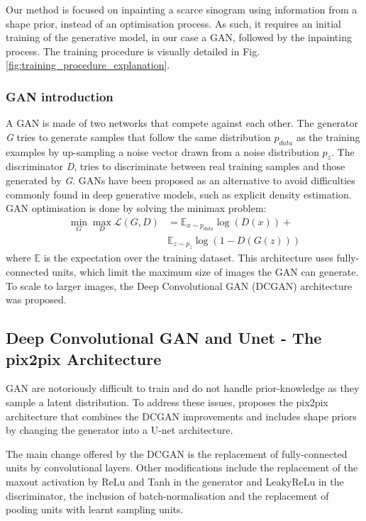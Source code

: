 \documentclass[../main.tex]{subfiles}
\begin{document}
Our method is focused on inpainting a scarce sinogram using information from a shape prior, instead of an optimisation process. As such, it requires an initial training of the generative model, in our case a GAN, followed by the inpainting process. The training procedure is visually detailed in Fig. \ref{fig:training_procedure_explanation}.

\subsubsection{GAN introduction}
A GAN is made of two networks that compete against each other. The generator \textit{G} tries to generate samples that follow the same distribution $p_{data}$ as the training examples by up-sampling a noise vector drawn from a noise distribution $p_{z}$. The discriminator \textit{D}, tries to discriminate between  real training samples and those generated by \textit{G}. GANs have been proposed as an alternative to avoid difficulties commonly found in deep generative models, such as explicit density estimation. GAN optimisation is done by solving the minimax problem: 
\begin{align*}
\label{GAN_Loss}
\min_G \max_D \mathcal{L}(\mathit{G}, \mathit{D}) &= \mathbb{E}_{x \sim p_{data}} \log(D(x)) +\\
& \mathbb{E}_{z \sim p_{z}} \log(1-D(G(z)))
\end{align*}
where $\mathbb{E}$ is the expectation over the training dataset. This architecture uses fully-connected units, which limit the maximum size of images the GAN can generate. To scale to larger images, the Deep Convolutional GAN (DCGAN) architecture \cite{radford2015unsupervised} was proposed. 

\subsection{Deep Convolutional GAN and Unet - The pix2pix Architecture}

GAN are notoriously difficult to train \cite{goodfellow2016nips} and do not handle prior-knowledge as they sample a latent distribution. To address these issues, \cite{isola2017image} proposes the pix2pix architecture that combines the DCGAN improvements and includes shape priors by changing the generator into a U-net architecture.

The main change offered by the DCGAN is the replacement of fully-connected units by convolutional layers. Other modifications include the replacement of the maxout \cite{goodfellow2013maxout} activation by ReLu and Tanh in the generator and LeakyReLu in the discriminator, the inclusion of batch-normalisation \cite{ioffe2015batch} and the replacement of pooling units with learnt sampling units. 
\end{document}
